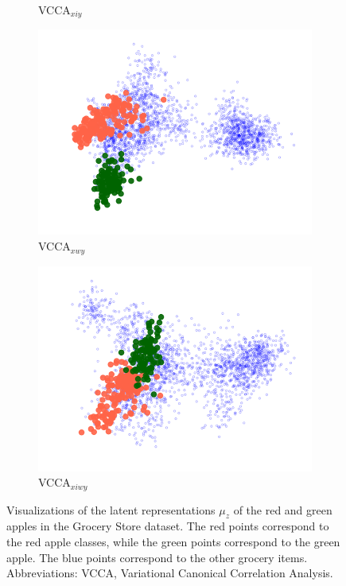 \begin{figure}[t]
\begin{subfigure}[b]{0.3\textwidth}
         \caption{VCCA$_{x i y}$}
         \label{fig:pca_vcca_xiy_apples}
     \end{subfigure} 
     \begin{subfigure}[b]{0.3\textwidth}
         \centering
         \includegraphics[width=\textwidth]{figures_and_tables/latent_space_visualizations/apples_new/pca_latent_apples_vcca_xwy_seed2.png}
         \caption{VCCA$_{x w y}$}
         \label{fig:pca_vcca_xwy_apples}
     \end{subfigure} 
     \begin{subfigure}[b]{0.3\textwidth}
         \centering
         \includegraphics[width=\textwidth]{figures_and_tables/latent_space_visualizations/apples_new/pca_latent_apples_vcca_xiwy_seed2.png}
         \caption{VCCA$_{x i w y}$}
         \label{fig:pca_vcca_xiwy_apples}
     \end{subfigure} 
    \caption{Visualizations of the latent representations $\mu_{z}$ of the red and green apples in the Grocery Store dataset. The red points correspond to the red apple classes, while the green points correspond to the green apple. The blue points correspond to the other grocery items. Abbreviations: VCCA, Variational Canonical Correlation Analysis.}
    \label{fig:2d_visualizations_pca_apples}
\end{figure}
